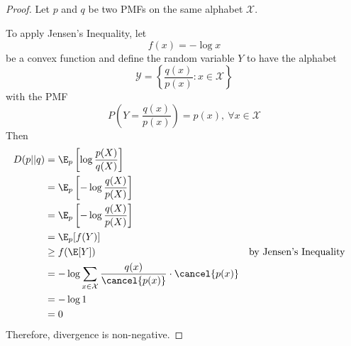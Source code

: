\documentclass[
  coursecode={MTHE 474},
  assignmentname={Homework \homeworknumber},
  studentnumber=20053722,
  name={Bryan Hoang},
]{
  ltxanswer%
}
\begin{document}
\begin{questions}
\begin{parts}
      \part{}
      \begin{solution}
        \begin{proof}
          Let \(p\) and \(q\) be two PMFs on the same alphabet \(\mathcal{X}\).

          To apply Jensen's Inequality, let
          \begin{equation*}
            f(x)=-\log x
          \end{equation*}
          be a convex function and define the random variable \(Y\) to have the alphabet
          \begin{equation*}
            \mathcal{Y}=\left\{\frac{q(x)}{p(x)} : x \in \mathcal{X}\right\}
          \end{equation*}
          with the PMF
          \begin{equation*}
            P\left(Y=\frac{q(x)}{p(x)}\right)=p(x),\ \forall x \in \mathcal{X}
          \end{equation*}
          Then
          \begin{align*}
            D(p||q) &= \E_{p}\left[\log\frac{p(X)}{q(X)}\right]                                                                    \\
                    &= \E_{p}\left[-\log\frac{q(X)}{p(X)}\right]                                                                   \\
                    &= \E_{p}\left[-\log\frac{q(X)}{p(X)}\right]                                                                   \\
                    &= \E_{p}[f(Y)]                                                                                                \\
                    &\ge f(\E[Y])                                                                 & &\text{by Jensen's Inequality} \\
                    &= -\log\sum_{x\in\mathcal{X}} \frac{q(x)}{\cancel{p(x)}} \cdot \cancel{p(x)}                                  \\
                    &= -\log 1                                                                                                     \\
                    &= 0
          \end{align*}
          Therefore, divergence is non-negative.
        \end{proof}
      \end{solution}
    \end{parts}
  \end{questions}
\end{document}
